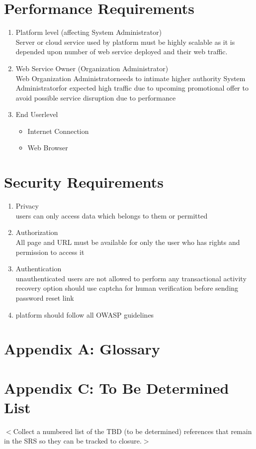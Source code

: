 \documentclass{scrreprt}
\newcommand*\arrow{\item[$\Rightarrow$]}
\def\superuser{System Administrator}
\def\admin{Organization Administrator}
\def\user{End User}
\begin{document}
\section{Performance Requirements}
\begin{enumerate}[start=1,label={\bfseries REQ \arabic*:}]
	\addtolength{\itemindent}{40pt}
	\item Platform level (affecting \superuser)
		\\ Server or cloud service used by platform must be highly scalable as it is depended upon number of web service deployed and their web traffic.
	\item Web Service Owner (\admin)
		\\ Web \admin \space needs to intimate higher authority \superuser \space for expected high traffic due to upcoming promotional offer to avoid possible service disruption due to performance
	\item \user \space level
		\begin{itemize}
			\arrow Internet Connection
			\arrow Web Browser
		\end{itemize}
\end{enumerate}

\section{Security Requirements}

\begin{enumerate}[start=1,label={\bfseries REQ \arabic*:}]
	\addtolength{\itemindent}{40pt}
	\item Privacy
		\\ users can only access data which belongs to them or permitted
	\item Authorization
		\\ All page and URL must be available for only the user who has rights and permission to access it
	\item Authentication
		\\ unauthenticated users are not allowed to perform any transactional activity
		\\ recovery option should use captcha for human verification before sending password reset link
	\item platform should follow all OWASP guidelines
		
\end{enumerate}

\section{Appendix A: Glossary}
\printglossary[type=\acronymtype]

\section{Appendix C: To Be Determined List}
$<$Collect a numbered list of the TBD (to be determined) references that remain 
in the SRS so they can be tracked to closure.$>$
\end{document}

